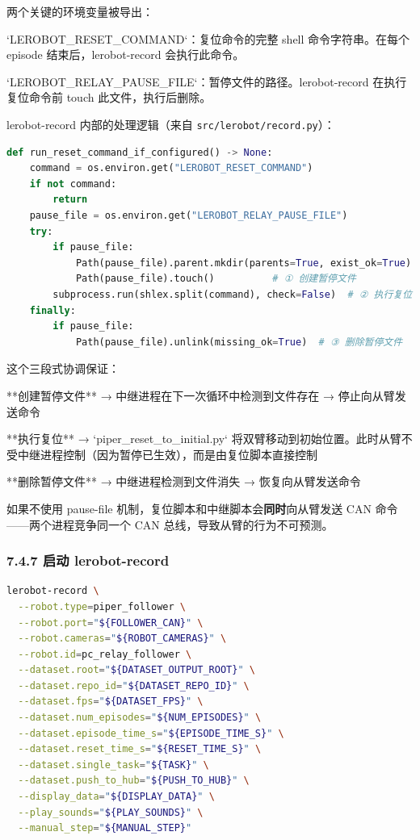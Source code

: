 \documentclass[UTF8,a4paper,11pt]{ctexart}
\begin{document}
{两个关键的环境变量被导出：
\item `LEROBOT_RESET_COMMAND`：复位命令的完整 shell 命令字符串。在每个 episode 结束后，lerobot-record 会执行此命令。
\item `LEROBOT_RELAY_PAUSE_FILE`：暂停文件的路径。lerobot-record 在执行复位命令前 touch 此文件，执行后删除。

lerobot-record 内部的处理逻辑（来自 \texttt{src/lerobot/record.py}）：

\begin{lstlisting}[language=python]
def run_reset_command_if_configured() -> None:
    command = os.environ.get("LEROBOT_RESET_COMMAND")
    if not command:
        return
    pause_file = os.environ.get("LEROBOT_RELAY_PAUSE_FILE")
    try:
        if pause_file:
            Path(pause_file).parent.mkdir(parents=True, exist_ok=True)
            Path(pause_file).touch()          # ① 创建暂停文件
        subprocess.run(shlex.split(command), check=False)  # ② 执行复位
    finally:
        if pause_file:
            Path(pause_file).unlink(missing_ok=True)  # ③ 删除暂停文件
\end{lstlisting}

这个三段式协调保证：
\item[1] **创建暂停文件** → 中继进程在下一次循环中检测到文件存在 → 停止向从臂发送命令
\item[2] **执行复位** → `piper_reset_to_initial.py` 将双臂移动到初始位置。此时从臂不受中继进程控制（因为暂停已生效），而是由复位脚本直接控制
\item[3] **删除暂停文件** → 中继进程检测到文件消失 → 恢复向从臂发送命令

如果不使用 pause-file 机制，复位脚本和中继脚本会\textbf{同时}向从臂发送 CAN 命令——两个进程竞争同一个 CAN 总线，导致从臂的行为不可预测。

\subsubsection{7.4.7 启动 lerobot-record}

\begin{lstlisting}[language=bash]
lerobot-record \
  --robot.type=piper_follower \
  --robot.port="${FOLLOWER_CAN}" \
  --robot.cameras="${ROBOT_CAMERAS}" \
  --robot.id=pc_relay_follower \
  --dataset.root="${DATASET_OUTPUT_ROOT}" \
  --dataset.repo_id="${DATASET_REPO_ID}" \
  --dataset.fps="${DATASET_FPS}" \
  --dataset.num_episodes="${NUM_EPISODES}" \
  --dataset.episode_time_s="${EPISODE_TIME_S}" \
  --dataset.reset_time_s="${RESET_TIME_S}" \
  --dataset.single_task="${TASK}" \
  --dataset.push_to_hub="${PUSH_TO_HUB}" \
  --display_data="${DISPLAY_DATA}" \
  --play_sounds="${PLAY_SOUNDS}" \
  --manual_step="${MANUAL_STEP}"
\end{lstlisting}

}
\end{document}
